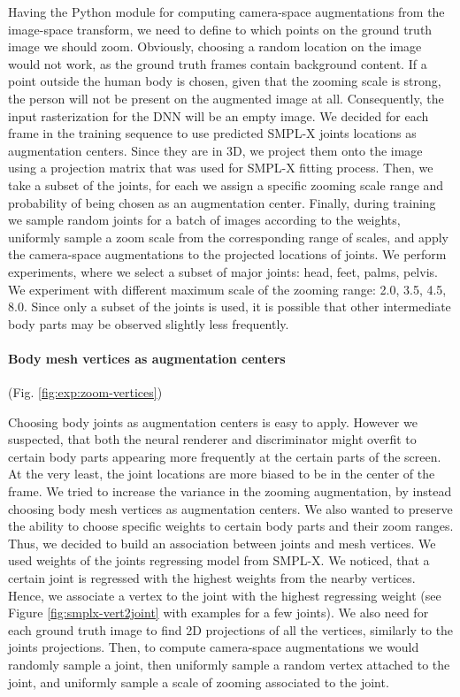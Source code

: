 Having the Python module for computing camera-space augmentations from the image-space transform, we need to define to which points on the ground truth image we should zoom. Obviously, choosing a random location on the image would not work, as the ground truth frames contain background content. If a point outside the human body is chosen, given that the zooming scale is strong, the person will not be present on the augmented image at all. Consequently, the input rasterization for the DNN will be an empty image. We decided for each frame in the training sequence to use predicted SMPL-X joints locations as augmentation centers. Since they are in 3D, we project them onto the image using a projection matrix that was used for SMPL-X fitting process. Then, we take a subset of the joints, for each we assign a specific zooming scale range and probability of being chosen as an augmentation center. Finally, during training we sample random joints for a batch of images according to the weights, uniformly sample a zoom scale from the corresponding range of scales, and apply the camera-space augmentations to the projected locations of joints. We perform experiments, where we select a subset of major joints: head, feet, palms, pelvis. We experiment with different maximum scale of the zooming range: 2.0, 3.5, 4.5, 8.0. Since only a subset of the joints is used, it is possible that other intermediate body parts may be observed slightly less frequently.

\vspace{-15pt}\paragraph{Body mesh vertices as augmentation centers}(Fig. \ref{fig:exp:zoom-vertices})\mbox{}\nopagebreak

Choosing body joints as augmentation centers is easy to apply. However we suspected, that both the neural renderer and discriminator might overfit to certain body parts appearing more frequently at the certain parts of the screen. At the very least, the joint locations are more biased to be in the center of the frame. We tried to increase the variance in the zooming augmentation, by instead choosing body mesh vertices as augmentation centers. We also wanted to preserve the ability to choose specific weights to certain body parts and their zoom ranges. Thus, we decided to build an association between joints and mesh vertices. We used weights of the joints regressing model from SMPL-X. We noticed, that a certain joint is regressed with the highest weights from the nearby vertices. Hence, we associate a vertex to the joint with the highest regressing weight (see Figure \ref{fig:smplx-vert2joint} with examples for a few joints).  We also need for each ground truth image to find 2D projections of all the vertices, similarly to the joints projections. Then, to compute camera-space augmentations we would randomly sample a joint, then uniformly sample a random vertex attached to the joint, and uniformly sample a scale of zooming associated to the joint. 

